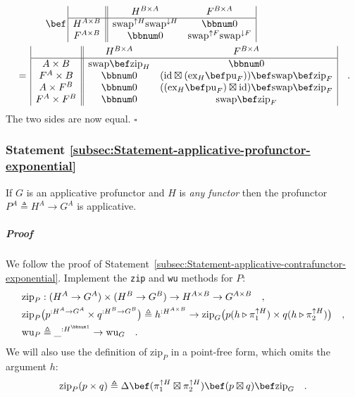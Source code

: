 \begin{align*}
 & \quad\quad\quad\bef\,\begin{array}{|c||cc|}
 & H^{B\times A} & F^{B\times A}\\
\hline H^{A\times B} & \text{swap}^{\uparrow H}\text{swap}^{\downarrow H} & \bbnum 0\\
F^{A\times B} & \bbnum 0 & \text{swap}^{\uparrow F}\text{swap}^{\downarrow F}
\end{array}\\
 & =\,\begin{array}{|c||cc|}
 & H^{B\times A} & F^{B\times A}\\
\hline A\times B & \text{swap}\bef\text{zip}_{H} & \bbnum 0\\
F^{A}\times B & \bbnum 0 & (\text{id}\boxtimes(\text{ex}_{H}\bef\text{pu}_{F}))\bef\text{swap}\bef\text{zip}_{F}\\
A\times F^{B} & \bbnum 0 & ((\text{ex}_{H}\bef\text{pu}_{F})\boxtimes\text{id})\bef\text{swap}\bef\text{zip}_{F}\\
F^{A}\times F^{B} & \bbnum 0 & \text{swap}\bef\text{zip}_{F}
\end{array}\quad.
\end{align*}
The two sides are now equal. $\square$

\subsubsection{Statement \label{subsec:Statement-applicative-profunctor-exponential}\ref{subsec:Statement-applicative-profunctor-exponential}}

If $G$ is an applicative profunctor and $H$ is \emph{any functor}
then the profunctor $P^{A}\triangleq H^{A}\rightarrow G^{A}$ is applicative.

\subparagraph{Proof}

We follow the proof of Statement~\ref{subsec:Statement-applicative-contrafunctor-exponential}.
Implement the \lstinline!zip! and \lstinline!wu! methods for $P$:
\begin{align*}
 & \text{zip}_{P}:(H^{A}\rightarrow G^{A})\times(H^{B}\rightarrow G^{B})\rightarrow H^{A\times B}\rightarrow G^{A\times B}\quad,\\
 & \text{zip}_{P}\big(p^{:H^{A}\rightarrow G^{A}}\times q^{:H^{B}\rightarrow G^{B}}\big)\triangleq h^{:H^{A\times B}}\rightarrow\text{zip}_{G}\big(p(h\triangleright\pi_{1}^{\uparrow H})\times q(h\triangleright\pi_{2}^{\uparrow H})\big)\quad,\\
 & \text{wu}_{P}\triangleq\_^{:H^{\bbnum 1}}\rightarrow\text{wu}_{G}\quad.
\end{align*}
We will also use the definition of $\text{zip}_{P}$ in a point-free
form, which omits the argument $h$:
\[
\text{zip}_{P}(p\times q)\triangleq\Delta\bef(\pi_{1}^{\uparrow H}\boxtimes\pi_{2}^{\uparrow H})\bef(p\boxtimes q)\bef\text{zip}_{G}\quad.
\]

